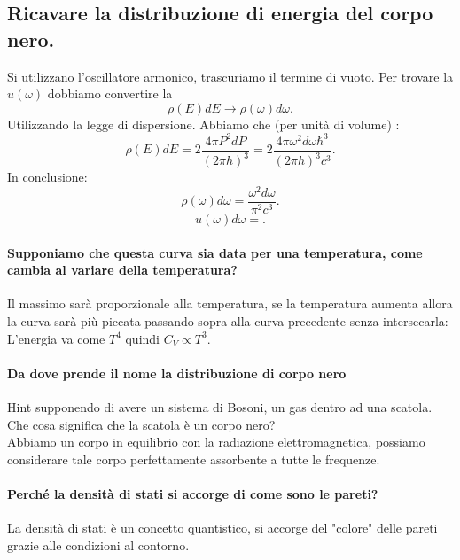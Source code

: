 \subsection{Ricavare la distribuzione di energia del corpo nero.}%
\label{sub:Ricavare la distribuzione di energia del corpo nero.}
Si utilizzano l'oscillatore armonico, trascuriamo il termine di vuoto. Per trovare la $u (\omega)$  dobbiamo convertire la 
\[
    \rho (E) dE \to \rho (\omega) d\omega
.\] 
Utilizzando la legge di dispersione. Abbiamo che (per unità di volume) :
\[
    \rho (E) dE = 2\frac{4\pi P^2 dP}{\left(2\pi h\right)^3} = 2 \frac{4\pi  \omega^2 d\omega  \hbar ^3}{\left(2\pi h\right)^3c^3}
.\] 
In conclusione:
\[
    \rho (\omega) d\omega = \frac{\omega^2 d\omega}{\pi^2c^3}
.\] 
\[
    u(\omega) d\omega  = 
.\]  
\paragraph{Supponiamo che questa curva sia data per una temperatura, come cambia al variare della temperatura?}%
\label{par:Supponiamo che questa curva sia data per una temperatura, come cambia al variare della temperatura?}
Il massimo sarà proporzionale alla temperatura, se la temperatura aumenta allora la curva sarà più piccata passando sopra alla curva precedente senza intersecarla:
L'energia va come $T^4$ quindi $C_V \propto  T^3$. 
\paragraph{Da dove prende il nome la distribuzione di corpo nero}%
\label{par:Da dove prende il nome la distribuzione di corpo nero}
Hint supponendo di avere un sistema di Bosoni, un gas dentro ad una scatola. Che cosa significa che la scatola è un corpo nero?\\
Abbiamo un corpo in equilibrio con la radiazione elettromagnetica, possiamo considerare tale corpo perfettamente assorbente a tutte le frequenze.
\paragraph{Perché la densità di stati si accorge di come sono le pareti?}%
\label{par:Perché la densità di stati si accorge di come sono le pareti?}
La densità di stati è un concetto quantistico, si accorge del "colore" delle pareti grazie alle condizioni al contorno. 
